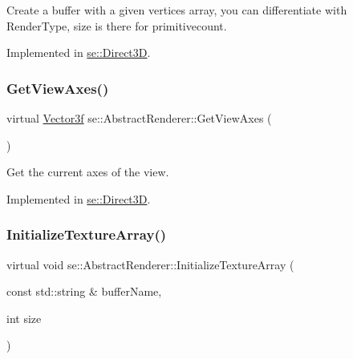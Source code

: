 Create a buffer with a given vertices array, you can differentiate with Render\+Type, size is there for primitivecount. 

Implemented in \mbox{\hyperlink{classse_1_1_direct3_d_a52e0bbf13e8045dab39bb2ef34028a94}{se\+::\+Direct3D}}.

\mbox{\label{classse_1_1_abstract_renderer_a8af4c1bef5cf120f6160f5d93dd74207}} 
\subsubsection{\texorpdfstring{Get\+View\+Axes()}{GetViewAxes()}}
{\footnotesize\ttfamily virtual \mbox{\hyperlink{namespacese_a12e07512d95e2fdebdaf74a5ea2cf5f6}{Vector3f}} se\+::\+Abstract\+Renderer\+::\+Get\+View\+Axes (\begin{DoxyParamCaption}{ }\end{DoxyParamCaption})\hspace{0.3cm}{\ttfamily [pure virtual]}}

Get the current axes of the view. 

Implemented in \mbox{\hyperlink{classse_1_1_direct3_d_a74d6926ba18dac6ce23c7dea433de7bd}{se\+::\+Direct3D}}.

\mbox{\label{classse_1_1_abstract_renderer_afd7697df1d4958ec3b0fa13109a269a1}} 
\subsubsection{\texorpdfstring{Initialize\+Texture\+Array()}{InitializeTextureArray()}}
{\footnotesize\ttfamily virtual void se\+::\+Abstract\+Renderer\+::\+Initialize\+Texture\+Array (\begin{DoxyParamCaption}\item[{const std\+::string \&}]{buffer\+Name,  }\item[{int}]{size }\end{DoxyParamCaption})\hspace{0.3cm}{\ttfamily [pure virtual]}}

